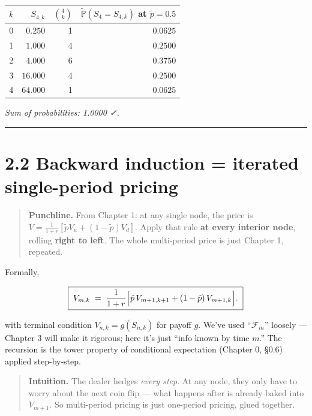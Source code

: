 \documentclass[
  10pt,
  twoside]{book}
\newcounter{none} %
\begin{document}
{\def\LTcaptype{none} %
\begin{table}[H]
\centering
\begin{tabular}{|r|r|r|r|}
\toprule
\(k\) & \(S_{4,k}\) & \(\binom{4}{k}\) & \(\tilde{\mathbb P}(S_4=S_{4,k})\) at \(\tilde p=0.5\) \\
\midrule



0 & \(\phantom{0}0.250\) & 1 & \(0.0625\) \\
1 & \(\phantom{0}1.000\) & 4 & \(0.2500\) \\
2 & \(\phantom{0}4.000\) & 6 & \(0.3750\) \\
3 & \(16.000\) & 4 & \(0.2500\) \\
4 & \(64.000\) & 1 & \(0.0625\) \\
\bottomrule
\end{tabular}
\end{table}
}

\emph{Sum of probabilities: 1.0000 ✓.}

\begin{center}\rule{0.5\linewidth}{0.5pt}\end{center}

\section{2.2 Backward induction = iterated single-period
pricing}\label{backward-induction-iterated-single-period-pricing}

\begin{quote}
\textbf{Punchline.} From Chapter 1: at any single node, the price is
\(V = \frac{1}{1+r}[\tilde p V_u + (1-\tilde p) V_d]\). Apply that rule
\textbf{at every interior node}, rolling \textbf{right to left}. The
whole multi-period price is just Chapter 1, repeated.
\end{quote}

Formally,

\[
\boxed{\;V_{m,k} \;=\; \frac{1}{1+r}\Bigl[\tilde p\, V_{m+1,k+1} + (1-\tilde p)\,V_{m+1,k}\Bigr].\;}
\]

with terminal condition \(V_{n,k} = g(S_{n,k})\) for payoff \(g\). We've
used ``\(\mathcal F_m\)'' loosely --- Chapter 3 will make it rigorous;
here it's just ``info known by time \(m\).'' The recursion is the tower
property of conditional expectation (Chapter 0, §0.6) applied
step-by-step.

\begin{quote}
\textbf{Intuition.} The dealer hedges \emph{every step}. At any node,
they only have to worry about the next coin flip --- what happens after
is already baked into \(V_{m+1}\). So multi-period pricing is just
one-period pricing, glued together.
\end{quote}
\end{document}
